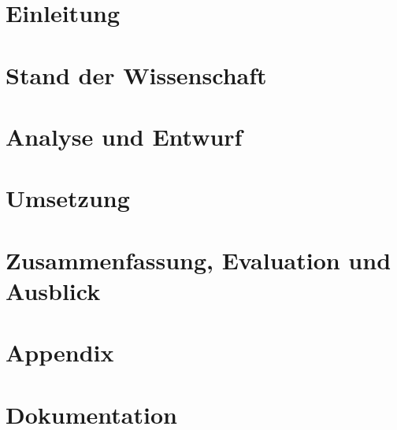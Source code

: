 \documentclass[
	12pt,
	BCOR=10mm,
	listof=totoc,
	bibliography=totoc
	]
{scrbook} %
\begin{document}

\begin{titlepage}
	
\end{titlepage} 

\frontmatter

\tableofcontents

\listoffigures

\listoftables


\twocolumn
\printglossaries

\onecolumn
\mainmatter
\chapter{Einleitung}
\label{ch:introduction}
 	
  
\chapter{Stand der Wissenschaft}
\label{ch:state-art}
 	

\chapter{Analyse und Entwurf}
\label{ch:probs-obs-procs}
 	
 	
\chapter{Umsetzung}
\label{ch:realisation}
 	

 	
\chapter{Zusammenfassung, Evaluation und Ausblick}
\label{ch:summ-eva-outl}
 	

\twocolumn 


\onecolumn
\appendix 	
\chapter{Appendix}
\label{ch:appendix}
 	 
 		
\chapter{Dokumentation}
\label{ch:documentation}
\end{document}
